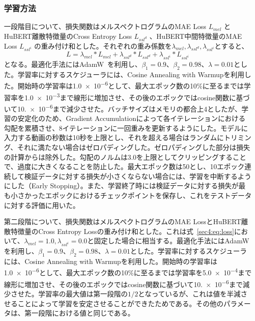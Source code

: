 \documentclass[12pt]{jarticle}
\numberwithin{equation}{section}    %
\numberwithin{figure}{section}      %
\numberwithin{table}{section}      %
\begin{document}
\subsubsection{学習方法}
一段階目について、損失関数はメルスペクトログラムのMAE Loss $L_{mel}$ とHuBERT離散特徴量のCross Entropy Loss $L_{ssl^{d}}$ 、HuBERT中間特徴量のMAE Loss $L_{ssl^{i}}$ の重み付け和とした。それぞれの重み係数を$\lambda_{mel}, \lambda_{ssl^{d}}, \lambda_{ssl^{i}}$とすると、
\begin{equation}
    \label{sec4:eq:loss}
    L = \lambda_{mel} * L_{mel} + \lambda_{ssl^{d}} * L_{ssl^{d}} + \lambda_{ssl^{i}} * L_{ssl^{i}}
\end{equation}
となる。最適化手法にはAdamW~\cite{loshchilov2017decoupled}を利用し、$\beta_{1} = 0.9$、$\beta_{2} = 0.98$、$\lambda = 0.01$とした。学習率に対するスケジューラには、Cosine Annealing with Warmupを利用した。開始時の学習率は\num{1.0e-6}として、最大エポック数の10\%に至るまでは学習率を\num{1.0e-3}まで線形に増加させ、その後のエポックではcosine関数に基づいて\num{10.e-6}まで減少させた。バッチサイズはメモリの都合上4としたが、学習の安定化のため、Gradient Accumulationによって各イテレーションにおける勾配を累積させ、8イテレーションに一回重みを更新するようにした。モデルに入力する動画の秒数は10秒を上限とし、それを超える場合はランダムにトリミング、それに満たない場合はゼロパディングした。ゼロパディングした部分は損失の計算からは除外した。勾配のノルムは3.0を上限としてクリッピングすることで、過度に大きくなることを防止した。最大エポック数は50とし、10エポック連続して検証データに対する損失が小さくならない場合には、学習を中断するようにした（Early Stopping）。また、学習終了時には検証データに対する損失が最も小さかったエポックにおけるチェックポイントを保存し、これをテストデータに対する評価に用いた。

第二段階について、損失関数はメルスペクトログラムのMAE LossとHuBERT離散特徴量のCross Entropy Lossの重み付け和とした。これは式~\eqref{sec4:eq:loss}において、$\lambda_{mel} = 1.0, \lambda_{ssl^{i}} = 0.0$と固定した場合に相当する。最適化手法にはAdamWを利用し、$\beta_{1} = 0.9$、$\beta_{2} = 0.98$、$\lambda = 0.01$とした。学習率に対するスケジューラには、Cosine Annealing with Warmupを利用した。開始時の学習率は\num{1.0e-6}として、最大エポック数の10\%に至るまでは学習率を\num{5.0e-4}まで線形に増加させ、その後のエポックではcosine関数に基づいて\num{10.e-6}まで減少させた。学習率の最大値は第一段階の$1/2$となっているが、これは値を半減させることによって学習を安定させることができたためである。その他のパラメータは、第一段階における値と同じである。
\end{document}
